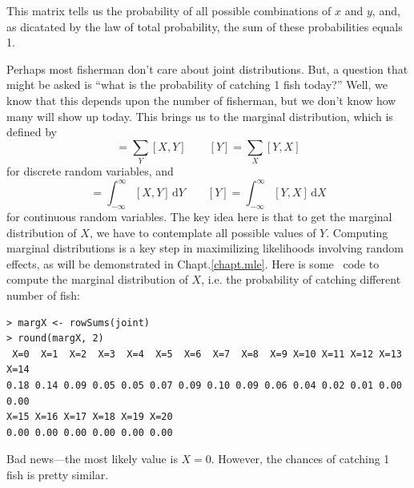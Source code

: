 This matrix tells us the probability of all possible combinations of
$x$ and $y$, and, as dicatated by the law of total probability, the sum
of these probabilities equals 1.

Perhaps most fisherman don't care about joint distributions. But, a
question that might be asked is ``what is the probability
of catching 1 fish today?'' Well, we know that this depends upon the
number of fisherman, but we don't know how many will show up
today. This brings us to the marginal distribution, which is defined by
\begin{equation*}
  [X] = \sum_Y [X,Y] \qquad
  [Y] = \sum_X [Y,X]
\end{equation*}
for discrete random variables, and
\begin{equation*}
  [X] = \int_{-\infty}^\infty [X,Y] \, \mathrm{d}Y \qquad
  [Y] = \int_{-\infty}^\infty [Y,X] \, \mathrm{d}X
\end{equation*}
for continuous random variables. The key idea here is that to get the
marginal distribution of $X$, we have to contemplate all possible
values of $Y$. Computing marginal distributions is a key step in
maximilizing likelihoods involving random effects, as will be
demonstrated in Chapt.\ref{chapt.mle}. Here is some \R~code to compute
the marginal distribution of $X$, i.e. the probability of catching
different number of fish:
\begin{verbatim}
> margX <- rowSums(joint)
> round(margX, 2)
 X=0  X=1  X=2  X=3  X=4  X=5  X=6  X=7  X=8  X=9 X=10 X=11 X=12 X=13 X=14
0.18 0.14 0.09 0.05 0.05 0.07 0.09 0.10 0.09 0.06 0.04 0.02 0.01 0.00 0.00
X=15 X=16 X=17 X=18 X=19 X=20
0.00 0.00 0.00 0.00 0.00 0.00
\end{verbatim}
Bad news---the most likely value is $X=0$. However, the chances of
catching 1 fish is pretty similar.

